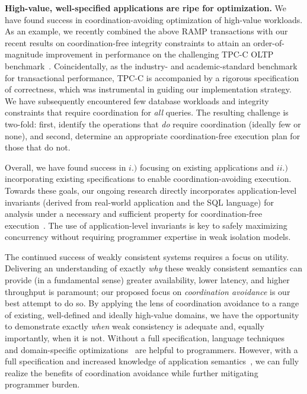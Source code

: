 \documentclass[9pt]{article}
\begin{document}
\begin{myitemize}
\item \textbf{High-value, well-specified applications are ripe for optimization.} We have found success in coordination-avoiding optimization of high-value workloads. As an example, we recently combined the above RAMP transactions with our recent results on coordination-free integrity constraints to attain an order-of-magnitude improvement in performance on the challenging TPC-C OLTP benchmark~\cite{coord-avoid,tpcc}. Coincidentally, as the industry- and academic-standard benchmark for transactional performance, TPC-C is accompanied by a rigorous specification of correctness, which was instrumental in guiding our implementation strategy. We have subsequently encountered few database workloads and integrity constraints that require coordination for \textit{all} queries. The resulting challenge is two-fold: first, identify the operations that \textit{do} require coordination (ideally few or none), and second, determine an appropriate coordination-free execution plan for those that do not.  \end{myitemize}

Overall, we have found success in $i.)$ focusing on existing applications and $ii.)$ incorporating existing specifications to enable coordination-avoiding execution. Towards these goals, our ongoing research directly incorporates application-level invariants (derived from real-world application and the SQL language) for analysis under a necessary and sufficient property for coordination-free execution~\cite{coord-avoid}. The use of application-level invariants is key to safely maximizing concurrency without requiring programmer expertise in weak isolation models.

 The continued success of weakly consistent systems requires a focus on utility. Delivering an understanding of exactly \textit{why} these weakly consistent semantics can provide (in a fundamental sense) greater availability, lower latency, and higher throughput is paramount; our proposed focus on \textit{coordination avoidance} is our best attempt to do so. By applying the lens of coordination avoidance to a range of existing, well-defined and ideally high-value domains, we have the opportunity to demonstrate exactly \textit{when} weak consistency is adequate and, equally importantly, when it is not. Without a full specification, language techniques~\cite{calm,blazes} and domain-specific optimizations~\cite{crdt} are helpful to programmers. However, with a full specification and increased knowledge of application semantics~\cite{coord-avoid,ramp-txns}, we can fully realize the benefits of coordination avoidance while further mitigating programmer burden.
\end{document}
